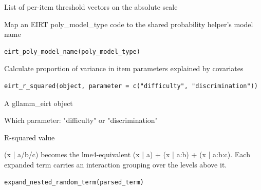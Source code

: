 \documentclass[a4paper]{book}
\begin{document}
%
\begin{Value}
List of per-item threshold vectors on the absolute scale
\end{Value}
%
\begin{Description}
Map an EIRT poly\_model\_type code to the shared probability helper's model name
\end{Description}
%
\begin{Usage}
\begin{verbatim}
eirt_poly_model_name(poly_model_type)
\end{verbatim}
\end{Usage}
%
\begin{Description}
Calculate proportion of variance in item parameters explained by covariates
\end{Description}
%
\begin{Usage}
\begin{verbatim}
eirt_r_squared(object, parameter = c("difficulty", "discrimination"))
\end{verbatim}
\end{Usage}
%
\begin{Arguments}
\begin{ldescription}
\item[\code{object}] A gllamm\_eirt object

\item[\code{parameter}] Which parameter: "difficulty" or "discrimination"
\end{ldescription}
\end{Arguments}
%
\begin{Value}
R-squared value
\end{Value}
%
\begin{Description}
(x | a/b/c) becomes the lme4-equivalent (x | a) + (x | a:b) + (x | a:b:c).
Each expanded term carries an interaction grouping over the levels above it.
\end{Description}
%
\begin{Usage}
\begin{verbatim}
expand_nested_random_term(parsed_term)
\end{verbatim}
\end{Usage}
\end{document}
